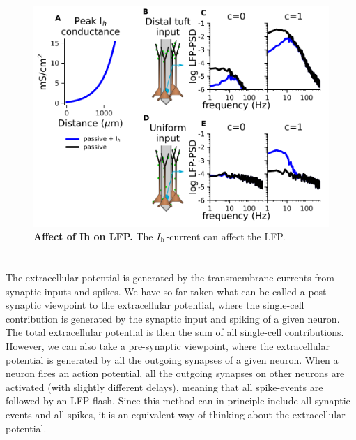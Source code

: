 \begin{figure}[!ht]
\begin{center}
\includegraphics[width=.8\textwidth]{Figures/LFP/effect_of_Ih.pdf}
\end{center}
\caption{\textbf{Affect of Ih on LFP.}
The $I_{\rm h}$-current can affect the LFP.}
\label{fig:LFP:Ih_effect}
\end{figure}

\section{}

\section{}
The extracellular potential is generated by the transmembrane currents from synaptic inputs and spikes.
We have so far taken what can be called a post-synaptic viewpoint to the extracellular potential, where the single-cell contribution is generated by the synaptic input and spiking of a given neuron. The total extracellular potential is then the sum of all single-cell contributions. However, we can also take a pre-synaptic viewpoint, where the extracellular potential is generated by all the outgoing synapses of a given neuron. When a neuron fires an action potential, all the outgoing synapses on other neurons are activated (with slightly different delays), meaning that all spike-events are followed by an LFP flash. 
Since this method can in principle include all synaptic events and all spikes, it 
is an equivalent way of thinking about the extracellular potential. 



